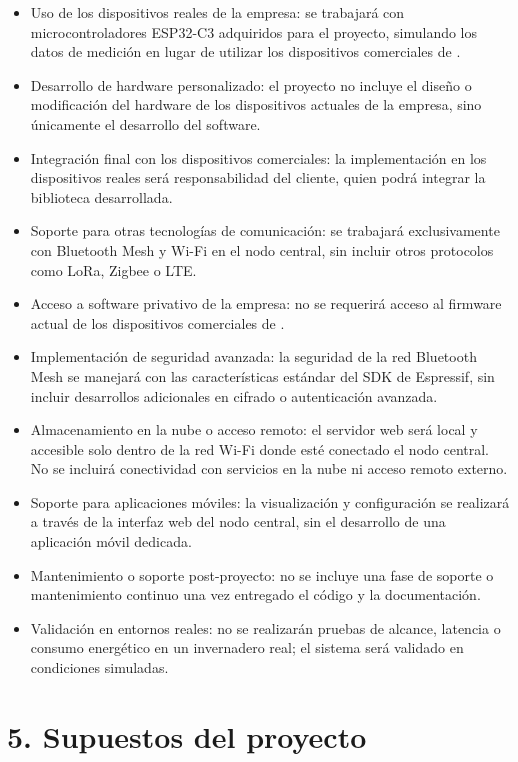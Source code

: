 \documentclass[
11pt, %
]{charter}
\begin{document}
\begin{itemize}
\item Uso de los dispositivos reales de la empresa: se trabajará con microcontroladores ESP32-C3 adquiridos para el proyecto, simulando los datos de medición en lugar de utilizar los dispositivos comerciales de {\empclientename}.
\item Desarrollo de hardware personalizado: el proyecto no incluye el diseño o modificación del hardware de los dispositivos actuales de la empresa, sino únicamente el desarrollo del software.
\item Integración final con los dispositivos comerciales: la implementación en los dispositivos reales será responsabilidad del cliente, quien podrá integrar la biblioteca desarrollada.
\item Soporte para otras tecnologías de comunicación: se trabajará exclusivamente con Bluetooth Mesh y Wi-Fi en el nodo central, sin incluir otros protocolos como LoRa, Zigbee o LTE.
\item Acceso a software privativo de la empresa: no se requerirá acceso al firmware actual de los dispositivos comerciales de {\empclientename}.
\item Implementación de seguridad avanzada: la seguridad de la red Bluetooth Mesh se manejará con las características estándar del SDK de Espressif, sin incluir desarrollos adicionales en cifrado o autenticación avanzada.
\item Almacenamiento en la nube o acceso remoto: el servidor web será local y accesible solo dentro de la red Wi-Fi donde esté conectado el nodo central. No se incluirá conectividad con servicios en la nube ni acceso remoto externo.
\item Soporte para aplicaciones móviles: la visualización y configuración se realizará a través de la interfaz web del nodo central, sin el desarrollo de una aplicación móvil dedicada.
\item Mantenimiento o soporte post-proyecto: no se incluye una fase de soporte o mantenimiento continuo una vez entregado el código y la documentación.
\item Validación en entornos reales: no se realizarán pruebas de alcance, latencia o consumo energético en un invernadero real; el sistema será validado en condiciones simuladas.
\end{itemize}

\section{5. Supuestos del proyecto}
\label{sec:supuestos}
\end{document}
